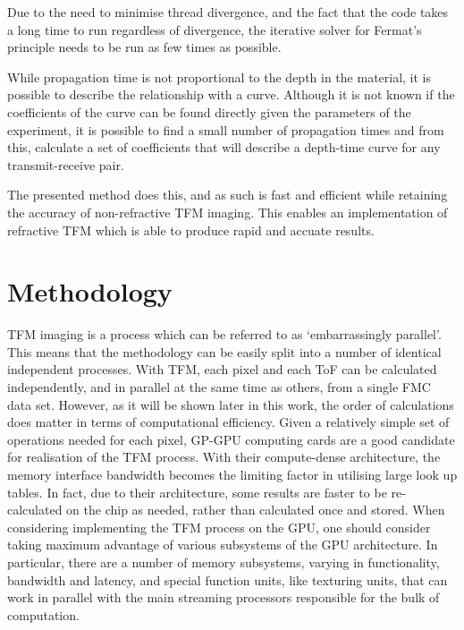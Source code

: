 Due to the need to minimise thread divergence, and the fact that the code takes a long time to run regardless of divergence, the iterative solver for Fermat's principle needs to be run as few times as possible. 

While propagation time is not proportional to the depth in the material, it is possible to describe the relationship with a curve. Although it is not known if the coefficients of the curve can be found directly given the parameters of the experiment, it is possible to find a small number of propagation times and from this, calculate a set of coefficients that will describe a depth-time curve for any transmit-receive pair.

The presented method does this, and as such is fast and efficient while retaining the accuracy of non-refractive TFM imaging. This enables an implementation of refractive TFM which is able to produce rapid and accuate results.

\section{Methodology}

TFM imaging is a process which can be referred to as `embarrassingly parallel'. This means that the methodology can be easily split into a number of identical independent processes. With TFM, each pixel and each ToF can be calculated independently, and in parallel at the same time as others, from a single FMC data set. However, as it will be shown later in this work, the order of calculations does matter in terms of computational efficiency. Given a relatively simple set of operations needed for each pixel, GP-GPU computing cards are a good candidate for realisation of the TFM process. With their compute-dense architecture, the memory interface bandwidth becomes the limiting factor in utilising large look up tables. In fact, due to their architecture, some results are faster to be re-calculated on the chip as needed, rather than calculated once and stored\cite{nvidia_cuda_guide}. When considering implementing the TFM process on the GPU, one should consider taking maximum advantage of various subsystems of the GPU architecture. In particular, there are a number of memory subsystems, varying in functionality, bandwidth and latency, and special function units, like texturing units, that can work in parallel with the main streaming processors responsible for the bulk of computation.

